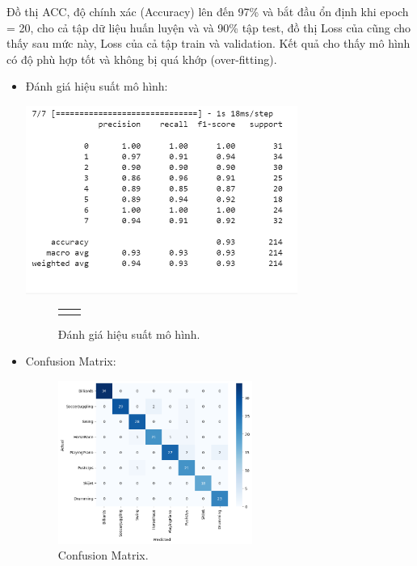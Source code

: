 Đồ thị ACC,  độ chính xác (Accuracy) lên đến 97\% và bắt đầu ổn định khi epoch = 20,  cho cả tập dữ liệu huấn luyện và và 90\% tập test, đồ thị Loss của cũng cho thấy sau mức này, Loss của cả tập train và validation. Kết quả cho thấy mô hình có độ phù hợp tốt và không bị quá khớp (over-fitting).
\newpage
\begin{itemize}
	\item Đánh giá hiệu suất mô hình:
 
	\includegraphics[width=0.7\textwidth]{Figures/evaluate_lrcn.PNG}
	\begin{figure}[h!] 
	\begin{tabular}{cc}
		\centering
	\end{tabular}
	\caption[Đánh giá hiệu suất mô hình.]{Đánh giá hiệu suất mô hình.}
	\label{fig:modelloss_and_Model Accuracy}
\end{figure}
	\item Confusion Matrix:
	
	\begin{figure}[h!]
		\centering
		\includegraphics[width=0.6\textwidth]{Figures/lstm_confusion.png}
		\caption[Confusion Matrix.]{Confusion Matrix.}
		\label{fig:lstm_confusion} 
	\end{figure}
\end{itemize}
